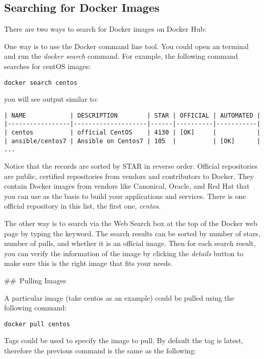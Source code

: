 \subsection{Searching for Docker Images}

There are two ways to search for Docker images on Docker Hub:

One way is to use the Docker command line tool. You could open an
terminal and run the \emph{docker search} command. For example, the
following command searches for centOS images:

\begin{lstlisting}
docker search centos
\end{lstlisting}

you will see output similar to:

\begin{lstlisting}
| NAME            | DESCRIPTION        | STAR | OFFICIAL | AUTOMATED |
|-----------------|--------------------|------|----------|-----------|
| centos          | official CentOS    | 4130 | [OK]     |           |
| ansible/centos7 | Ansible on Centos7 | 105  |          | [OK]      |
...
\end{lstlisting}

Notice that the records are sorted by STAR in reverse order. Official
repositories are public, certified repositories from vendors and
contributors to Docker. They contain Docker images from vendors like
Canonical, Oracle, and Red Hat that you can use as the basis to build
your applications and services. There is one official repository in this
list, the first one, \emph{centos}.

The other way is to search via the Web Search box at the top of the
Docker web page by typing the keyword. The search results can be sorted
by number of stars, number of pulls, and whether it is an official
image. Then for each search result, you can verify the information of
the image by clicking the \emph{details} button to make sure this is the
right image that fits your needs.

\#\#~Pulling Images

A particular image (take centos as an example) could be pulled using the
following command:

\begin{lstlisting}
docker pull centos
\end{lstlisting}

Tags could be used to specify the image to pull. By default the tag is
latest, therefore the previous command is the same as the following:


